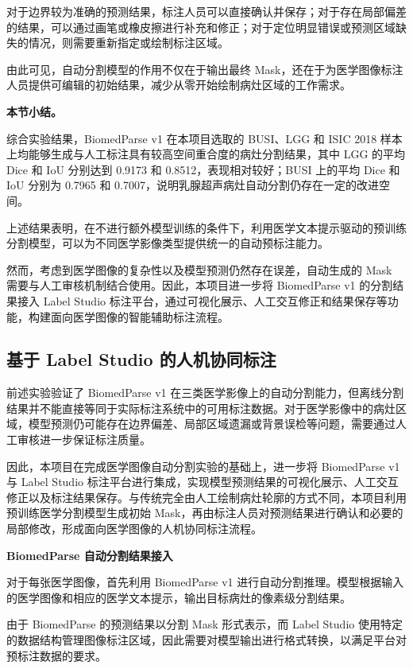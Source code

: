 \documentclass[10.5pt,compsoc]{CjC}
\theoremstyle{mystyle}
\begin{document}
对于边界较为准确的预测结果，标注人员可以直接确认并保存；对于存在局部偏差的结果，可以通过画笔或橡皮擦进行补充和修正；对于定位明显错误或预测区域缺失的情况，则需要重新指定或绘制标注区域。

由此可见，自动分割模型的作用不仅在于输出最终 Mask，还在于为医学图像标注人员提供可编辑的初始结果，减少从零开始绘制病灶区域的工作需求。



\noindent\textbf{本节小结。}

综合实验结果，BiomedParse v1 在本项目选取的 BUSI、LGG 和 ISIC 2018 样本上均能够生成与人工标注具有较高空间重合度的病灶分割结果，其中 LGG 的平均 Dice 和 IoU 分别达到 0.9173 和 0.8512，表现相对较好；BUSI 上的平均 Dice 和 IoU 分别为 0.7965 和 0.7007，说明乳腺超声病灶自动分割仍存在一定的改进空间。

上述结果表明，在不进行额外模型训练的条件下，利用医学文本提示驱动的预训练分割模型，可以为不同医学影像类型提供统一的自动预标注能力。

然而，考虑到医学图像的复杂性以及模型预测仍然存在误差，自动生成的 Mask 需要与人工审核机制结合使用。因此，本项目进一步将 BiomedParse v1 的分割结果接入 Label Studio 标注平台，通过可视化展示、人工交互修正和结果保存等功能，构建面向医学图像的智能辅助标注流程。






\subsection{基于 Label Studio 的人机协同标注}

前述实验验证了 BiomedParse v1 在三类医学影像上的自动分割能力，但离线分割结果并不能直接等同于实际标注系统中的可用标注数据。对于医学影像中的病灶区域，模型预测仍可能存在边界偏差、局部区域遗漏或背景误检等问题，需要通过人工审核进一步保证标注质量。

因此，本项目在完成医学图像自动分割实验的基础上，进一步将 BiomedParse v1 与 Label Studio 标注平台进行集成，实现模型预测结果的可视化展示、人工交互修正以及标注结果保存。与传统完全由人工绘制病灶轮廓的方式不同，本项目利用预训练医学分割模型生成初始 Mask，再由标注人员对预测结果进行确认和必要的局部修改，形成面向医学图像的人机协同标注流程。

\noindent\textbf{BiomedParse 自动分割结果接入}

对于每张医学图像，首先利用 BiomedParse v1 进行自动分割推理。模型根据输入的医学图像和相应的医学文本提示，输出目标病灶的像素级分割结果。

由于 BiomedParse 的预测结果以分割 Mask 形式表示，而 Label Studio 使用特定的数据结构管理图像标注区域，因此需要对模型输出进行格式转换，以满足平台对预标注数据的要求。
\end{document}
